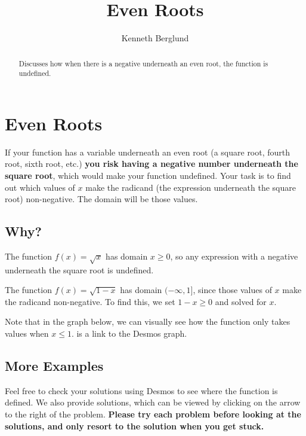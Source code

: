 \documentclass{ximera}
\title{Even Roots}
\author{Kenneth Berglund}
\begin{document}
\begin{abstract}
Discusses how when there is a negative underneath an even root, the function is undefined. 
\end{abstract}
\maketitle

\section{Even Roots}
If your function has a variable underneath an even root (a square root, fourth root, sixth root, etc.) \textbf{you risk having a negative number underneath the square root}, which would make your function undefined. Your task is to find out which values of $x$ make the radicand (the expression underneath the square root) non-negative. The domain will be those values.

\subsection{Why?}
The function $f(x) = \sqrt{x}$ has domain $x \ge 0$, so any expression with a negative underneath the square root is undefined. 

\begin{example}
The function $f(x) = \sqrt{1 - x}$ has domain $(-\infty, 1]$, since those values of $x$ make the radicand non-negative. To find this, we set $1 - x \ge 0$ and solved for $x$. 

Note that in the graph below, we can visually see how the function only takes values when $x \le 1$.  is a link to the Desmos graph. 
\begin{center}
\end{center}
\end{example}


\subsection{More Examples}
Feel free to check your solutions using Desmos to see where the function is defined. We also provide solutions, which can be viewed by clicking on the arrow to the right of the problem. \textbf{Please try each problem before looking at the solutions, and only resort to the solution when you get stuck.} 
\end{document}
